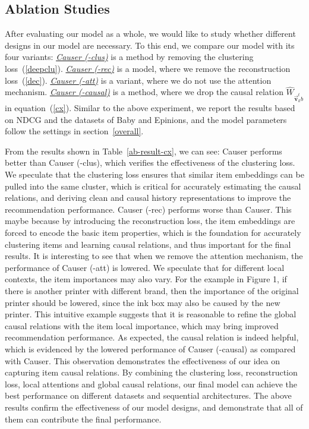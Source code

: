 \documentclass[conference]{IEEEtran}
\theoremstyle{definition}
\theoremstyle{theorem}
\theoremstyle{proof}
\theoremstyle{remark}
\begin{document}
\subsection{Ablation Studies}
After evaluating our model as a whole, we would like to study whether different designs in our model are necessary.
To this end, we compare our model with its four {variants}:
\underline{\textit{Causer (-clus)}} is a method by removing the clustering loss~(\ref{deepclu}).
\underline{\textit{Causer (-rec)}} is a model, where we remove the reconstruction loss~(\ref{dec}).
\underline{\textit{Causer (-att)}} is a variant, where we do not use the attention mechanism. 
\underline{\textit{Causer (-causal)}} is a method, where we drop the causal relation $\hat{{W}}_{\vec{\bm{v}}_k^{t}b}$ in equation~(\ref{cx}).
Similar to the above experiment, we report the results based on NDCG and the datasets of Baby and Epinions, and the model parameters follow the settings in section~\ref{overall}.

From the results shown in Table~\ref{ab-result-cx}, we can see:
Causer performs better than Causer (-clus), which verifies the effectiveness of the clustering loss.
We speculate that the clustering loss ensures that similar item embeddings can be pulled into the same cluster, which is critical for accurately estimating the causal relations, and deriving clean and causal history representations to improve the recommendation performance.
Causer (-rec) performs worse than Causer.
This maybe because by introducing the reconstruction loss, the item embeddings are forced to encode the basic item properties, which is the foundation for accurately clustering items and learning causal relations, and thus important for the final results. 
It is interesting to see that when we remove the attention mechanism, the performance of Causer (-att) is lowered.
We speculate that for different local contexts, the item importances may also vary.
For the example in Figure 1, if there is another printer with different brand, then the importance of the original printer should be lowered, since the ink box may also be caused by the new printer.
This intuitive example suggests that it is reasonable to refine the global causal relations with the item local importance, which may bring improved recommendation performance.
As expected, the causal relation is indeed helpful, which is evidenced by the lowered performance of Causer (-causal) as compared with Causer. 
This observation demonstrates the effectiveness of our idea on capturing item causal relations.
By combining the clustering loss, reconstruction loss, local attentions and global causal relations, our final model can achieve the best performance on different datasets and sequential architectures. 
The above results confirm the effectiveness of our model designs, and demonstrate that all of them can contribute the final performance.
\end{document}
